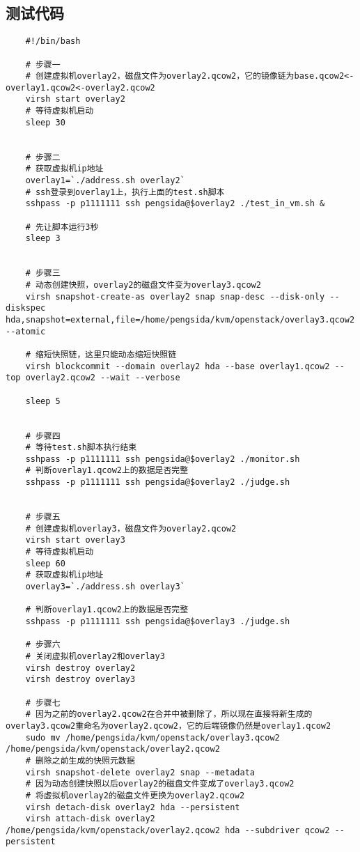 \documentclass[a4paper,left=1.5cm,right=1.5cm,11pt]{article}
\begin{document}
\subsection{测试代码}
	\begin{lstlisting}
	#!/bin/bash

	# 步骤一
	# 创建虚拟机overlay2，磁盘文件为overlay2.qcow2，它的镜像链为base.qcow2<-overlay1.qcow2<-overlay2.qcow2
	virsh start overlay2
	# 等待虚拟机启动
	sleep 30


	# 步骤二
	# 获取虚拟机ip地址
	overlay1=`./address.sh overlay2`
	# ssh登录到overlay1上，执行上面的test.sh脚本
	sshpass -p p1111111 ssh pengsida@$overlay2 ./test_in_vm.sh &

	# 先让脚本运行3秒
	sleep 3


	# 步骤三
	# 动态创建快照，overlay2的磁盘文件变为overlay3.qcow2
	virsh snapshot-create-as overlay2 snap snap-desc --disk-only --diskspec hda,snapshot=external,file=/home/pengsida/kvm/openstack/overlay3.qcow2 --atomic

	# 缩短快照链，这里只能动态缩短快照链
	virsh blockcommit --domain overlay2 hda --base overlay1.qcow2 --top overlay2.qcow2 --wait --verbose

	sleep 5


	# 步骤四
	# 等待test.sh脚本执行结束
	sshpass -p p1111111 ssh pengsida@$overlay2 ./monitor.sh
	# 判断overlay1.qcow2上的数据是否完整
	sshpass -p p1111111 ssh pengsida@$overlay2 ./judge.sh


	# 步骤五
	# 创建虚拟机overlay3，磁盘文件为overlay2.qcow2
	virsh start overlay3
	# 等待虚拟机启动
	sleep 60
	# 获取虚拟机ip地址
	overlay3=`./address.sh overlay3`

	# 判断overlay1.qcow2上的数据是否完整
	sshpass -p p1111111 ssh pengsida@$overlay3 ./judge.sh

	# 步骤六
	# 关闭虚拟机overlay2和overlay3
	virsh destroy overlay2
	virsh destroy overlay3

	# 步骤七
	# 因为之前的overlay2.qcow2在合并中被删除了，所以现在直接将新生成的overlay3.qcow2重命名为overlay2.qcow2，它的后端镜像仍然是overlay1.qcow2
	sudo mv /home/pengsida/kvm/openstack/overlay3.qcow2 /home/pengsida/kvm/openstack/overlay2.qcow2
	# 删除之前生成的快照元数据
	virsh snapshot-delete overlay2 snap --metadata
	# 因为动态创建快照以后overlay2的磁盘文件变成了overlay3.qcow2
	# 将虚拟机overlay2的磁盘文件更换为overlay2.qcow2
	virsh detach-disk overlay2 hda --persistent
	virsh attach-disk overlay2 /home/pengsida/kvm/openstack/overlay2.qcow2 hda --subdriver qcow2 --persistent
	\end{lstlisting}
\end{document}
